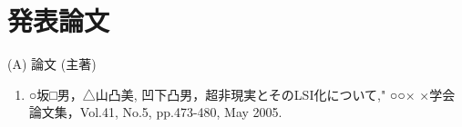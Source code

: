 \chapter*{発表論文}
\pagestyle{empty}
(A)	論文 (主著) 

\begin{enumerate}
\item ○坂□男，△山凸美, 凹下凸男，超非現実とそのLSI化について," ○○×
      ×学会論文集，Vol.41, No.5, pp.473-480, May 2005.
\end{enumerate}

